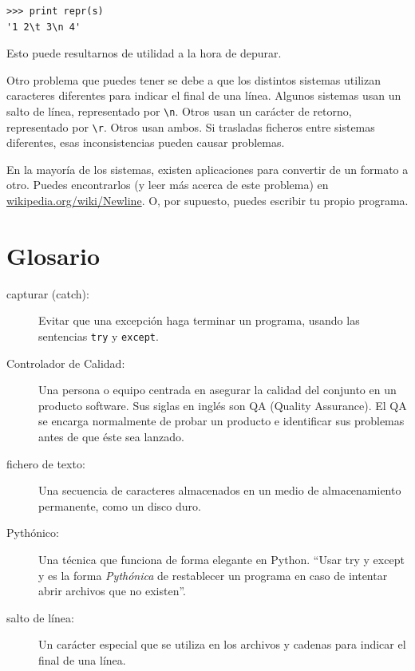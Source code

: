 \beforeverb
\begin{verbatim}
>>> print repr(s)
'1 2\t 3\n 4'
\end{verbatim}
\afterverb

Esto puede resultarnos de utilidad a la hora de depurar.

Otro problema que puedes tener se debe a que los distintos sistemas
utilizan caracteres diferentes para indicar el final de una línea. Algunos
sistemas usan un salto de línea, representado por \verb"\n". Otros
usan un carácter de retorno, representado por \verb"\r". Otros usan ambos.
Si trasladas ficheros entre sistemas diferentes, esas inconsistencias
pueden causar problemas.


En la mayoría de los sistemas, existen aplicaciones para convertir de un
formato a otro. Puedes encontrarlos (y leer más acerca de este
problema) en \url{wikipedia.org/wiki/Newline}.  O, por supuesto, puedes
escribir tu propio programa.


\section{Glosario}

\begin{description}

\item[capturar (catch):] Evitar que una excepción haga terminar
un programa, usando las sentencias {\tt try} y {\tt except}.

\item[Controlador de Calidad:] Una persona o equipo centrada en asegurar
la calidad del conjunto en un producto software.
Sus siglas en inglés son QA (Quality Assurance). El QA se encarga normalmente
de probar un producto e identificar sus problemas antes de que éste
sea lanzado.

\item[fichero de texto:] Una secuencia de caracteres almacenados en un
medio de almacenamiento permanente, como un disco duro.

\item[Pythónico:] Una técnica que funciona de forma elegante en Python.
``Usar try y except y es la forma \emph{Pythónica} de restablecer un programa en
caso de intentar abrir archivos que no existen''.

\item[salto de línea:] Un carácter especial que se utiliza en los archivos y cadenas
para indicar el final de una línea.

\end{description}


